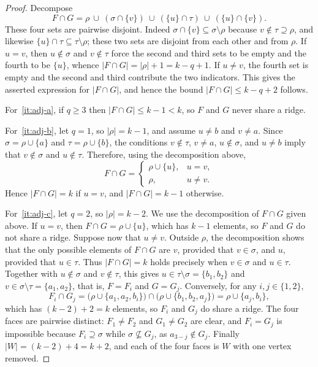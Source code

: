 \documentclass[11pt,reqno]{amsart}
\numberwithin{equation}{section}
\theoremstyle{plain}
\theoremstyle{definition}
\begin{document}
\begin{proof}
Decompose
\[
  F\cap G=\rho\ \cup\ (\sigma\cap\{v\})\ \cup\ (\{u\}\cap\tau)\ \cup\ (\{u\}\cap\{v\}) .
\]
These four sets are pairwise disjoint. Indeed $\sigma\cap\{v\}\subseteq\sigma\setminus\rho$
because $v\notin\tau\supseteq\rho$, and likewise $\{u\}\cap\tau\subseteq\tau\setminus\rho$;
these two sets are disjoint from each other and from $\rho$. If $u=v$, then $u\notin\sigma$ and
$v\notin\tau$ force the second and third sets to be empty and the fourth to be $\{u\}$, whence
$|F\cap G|=|\rho|+1=k-q+1$. If $u\ne v$, the fourth set is empty and the second and third
contribute the two indicators. This gives the asserted expression for $|F\cap G|$, and hence the bound
$|F\cap G|\le k-q+2$ follows.

For~\ref{it:adj-a}, if $q\ge3$ then $|F\cap G|\le k-1<k$, so $F$ and $G$ never share a ridge.

For~\ref{it:adj-b}, let $q=1$, so $|\rho|=k-1$, and assume $u\ne b$ and $v\ne a$.
Since $\sigma=\rho\cup\{a\}$ and $\tau=\rho\cup\{b\}$, the conditions
$v\notin\tau$, $v\ne a$, $u\notin\sigma$, and $u\ne b$ imply that
$v\notin\sigma$ and $u\notin\tau$. Therefore, using the decomposition above,
\[
  F\cap G=
  \begin{cases}
    \rho\cup\{u\}, & u=v,\\
    \rho, & u\ne v.
  \end{cases}
\]
Hence $|F\cap G|=k$ if $u=v$, and $|F\cap G|=k-1$ otherwise.

For~\ref{it:adj-c}, let $q=2$, so $|\rho|=k-2$. We use the decomposition of $F\cap G$ given above.
If $u=v$, then $F\cap G=\rho\cup\{u\}$, which has $k-1$ elements, so $F$ and $G$ do not
share a ridge. Suppose now that $u\ne v$. Outside $\rho$, the decomposition shows that the only
possible elements of $F\cap G$ are $v$, provided that $v\in\sigma$, and $u$, provided that
$u\in\tau$. Thus $|F\cap G|=k$ holds precisely when $v\in\sigma$ and $u\in\tau$. Together with
$u\notin\sigma$ and $v\notin\tau$, this gives
$u\in\tau\setminus\sigma=\{b_1,b_2\}$ and
$v\in\sigma\setminus\tau=\{a_1,a_2\}$, that is, $F=F_i$ and $G=G_j$. Conversely, for any
$i,j\in\{1,2\}$,
\[
  F_i\cap G_j=\bigl(\rho\cup\{a_1,a_2,b_i\}\bigr)\cap\bigl(\rho\cup\{b_1,b_2,a_j\}\bigr)
  =\rho\cup\{a_j,b_i\},
\]
which has $(k-2)+2=k$ elements, so $F_i$ and $G_j$ do share a ridge. The four faces are
pairwise distinct: $F_1\ne F_2$ and $G_1\ne G_2$ are clear, and $F_i=G_j$ is impossible because
$F_i\supseteq\sigma$ while $\sigma\not\subseteq G_j$, as $a_{3-j}\notin G_j$. Finally
$|W|=(k-2)+4=k+2$, and each of the four faces is $W$ with one vertex removed.
\end{proof}
\end{document}
